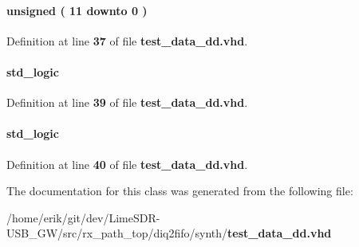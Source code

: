 \paragraph[{cnt\+\_\+l}]{ {\bfseries \textcolor{comment}{unsigned}\textcolor{vhdlchar}{ }\textcolor{vhdlchar}{(}\textcolor{vhdlchar}{ }\textcolor{vhdlchar}{ } \textcolor{vhdldigit}{11} \textcolor{vhdlchar}{ }\textcolor{keywordflow}{downto}\textcolor{vhdlchar}{ }\textcolor{vhdlchar}{ } \textcolor{vhdldigit}{0} \textcolor{vhdlchar}{ }\textcolor{vhdlchar}{)}\textcolor{vhdlchar}{ }} \hspace{0.3cm}{\ttfamily [Signal]}}\label{classtest__data__dd_1_1arch_a84d672e711bf51130d5bb5c4837b82e7}


Definition at line {\bf 37} of file {\bf test\+\_\+data\+\_\+dd.\+vhd}.

\paragraph[{iq\+\_\+sel}]{ {\bfseries \textcolor{comment}{std\+\_\+logic}\textcolor{vhdlchar}{ }} \hspace{0.3cm}{\ttfamily [Signal]}}\label{classtest__data__dd_1_1arch_af4d5d79c2f5551c7e0663afa057bcc4c}


Definition at line {\bf 39} of file {\bf test\+\_\+data\+\_\+dd.\+vhd}.

\paragraph[{iq\+\_\+sel\+\_\+out}]{ {\bfseries \textcolor{comment}{std\+\_\+logic}\textcolor{vhdlchar}{ }} \hspace{0.3cm}{\ttfamily [Signal]}}\label{classtest__data__dd_1_1arch_a25ec63f8a7116d6c022eeef90a3a2db4}


Definition at line {\bf 40} of file {\bf test\+\_\+data\+\_\+dd.\+vhd}.



The documentation for this class was generated from the following file\+:\begin{DoxyCompactItemize}
\item 
/home/erik/git/dev/\+Lime\+S\+D\+R-\/\+U\+S\+B\+\_\+\+G\+W/src/rx\+\_\+path\+\_\+top/diq2fifo/synth/{\bf test\+\_\+data\+\_\+dd.\+vhd}\end{DoxyCompactItemize}
